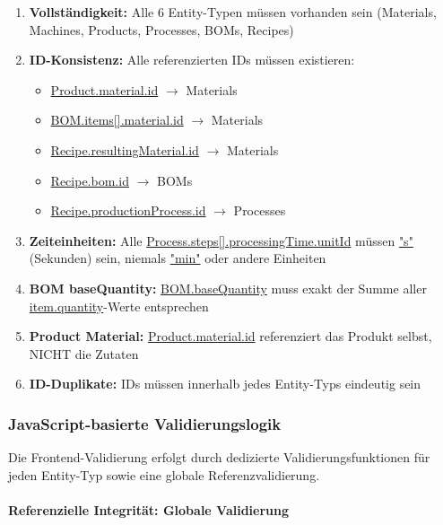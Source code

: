\begin{enumerate}
    \item \textbf{Vollständigkeit:} Alle 6 Entity-Typen müssen vorhanden sein (Materials, Machines, Products, Processes, BOMs, Recipes)

    \item \textbf{ID-Konsistenz:} Alle referenzierten IDs müssen existieren:
    \begin{itemize}
        \item \url{Product.material.id} $\rightarrow$ Materials
        \item \url{BOM.items[].material.id} $\rightarrow$ Materials
        \item \url{Recipe.resultingMaterial.id} $\rightarrow$ Materials
        \item \url{Recipe.bom.id} $\rightarrow$ BOMs
        \item \url{Recipe.productionProcess.id} $\rightarrow$ Processes
    \end{itemize}

    \item \textbf{Zeiteinheiten:} Alle \url{Process.steps[].processingTime.unitId} müssen \url{"s"} (Sekunden) sein, niemals \url{"min"} oder andere Einheiten

    \item \textbf{BOM baseQuantity:} \url{BOM.baseQuantity} muss exakt der Summe aller \url{item.quantity}-Werte entsprechen

    \item \textbf{Product Material:} \url{Product.material.id} referenziert das Produkt selbst, NICHT die Zutaten

    \item \textbf{ID-Duplikate:} IDs müssen innerhalb jedes Entity-Typs eindeutig sein
\end{enumerate}

\subsubsection{JavaScript-basierte Validierungslogik}

Die Frontend-Validierung erfolgt durch dedizierte Validierungsfunktionen für jeden Entity-Typ sowie eine globale Referenzvalidierung.

\paragraph{Referenzielle Integrität: Globale Validierung}

